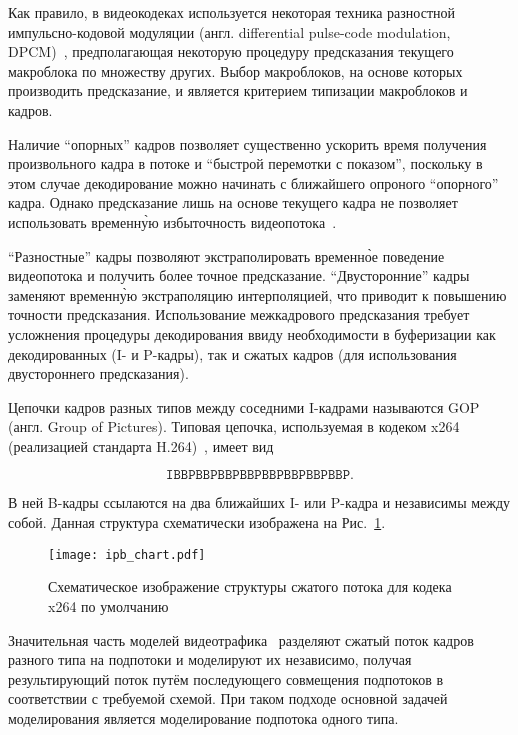 Как правило, в видеокодеках используется некоторая техника
разностной импульсно-кодовой модуляции (англ. differential
pulse-code modulation, DPCM)~\cite{sklarbook}, предполагающая некоторую
процедуру предсказания текущего макроблока по множеству других.
Выбор макроблоков, на основе которых производить предсказание,
и является критерием типизации макроблоков и кадров.

Наличие ``опорных'' кадров позволяет существенно ускорить
время получения произвольного кадра в потоке и ``быстрой
перемотки с показом'', поскольку в этом случае декодирование
можно начинать с ближайшего опроного ``опорного'' кадра.
Однако предсказание лишь на основе текущего кадра не
позволяет использовать временн\`{у}ю избыточность
видеопотока~\cite{salomoncomp}.

``Разностные'' кадры позволяют
экстраполировать временн\`{о}е поведение видеопотока
и получить более точное предсказание. ``Двусторонние''
кадры заменяют временн\`{у}ю экстраполяцию интерполяцией,
что приводит к повышению точности предсказания.
Использование межкадрового предсказания требует
усложнения процедуры декодирования ввиду необходимости в
буферизации как декодированных (I- и P-кадры), так и
сжатых кадров (для использования двустороннего предсказания).

Цепочки кадров разных типов между соседними I-кадрами называются
GOP (англ. Group of Pictures). Типовая цепочка, используемая
в кодеком x264 (реализацией стандарта H.264)~\cite{x264page},
имеет вид

$$
\mathtt{IBBPBBPBBPBBPBBPBBPBBPBBP}.
$$

В ней B-кадры
ссылаются на два ближайших I- или P-кадра и независимы
между собой. Данная структура схематически изображена
на Рис.~\ref{fig:ipb_frames}.

\begin{figure}[h]
    \begin{center}
        \texttt{[image: ipb\_chart.pdf]}
    \end{center}
    \caption{Схематическое изображение структуры сжатого потока
    для кодека x264 по умолчанию}
    \label{fig:ipb_frames}
\end{figure}

Значительная часть моделей видеотрафика~\cite{survey2013} разделяют
сжатый поток кадров разного типа на подпотоки и моделируют
их независимо, получая результирующий поток путём последующего
совмещения подпотоков в соответствии с требуемой схемой.
При таком подходе основной задачей моделирования является
моделирование подпотока одного типа.

